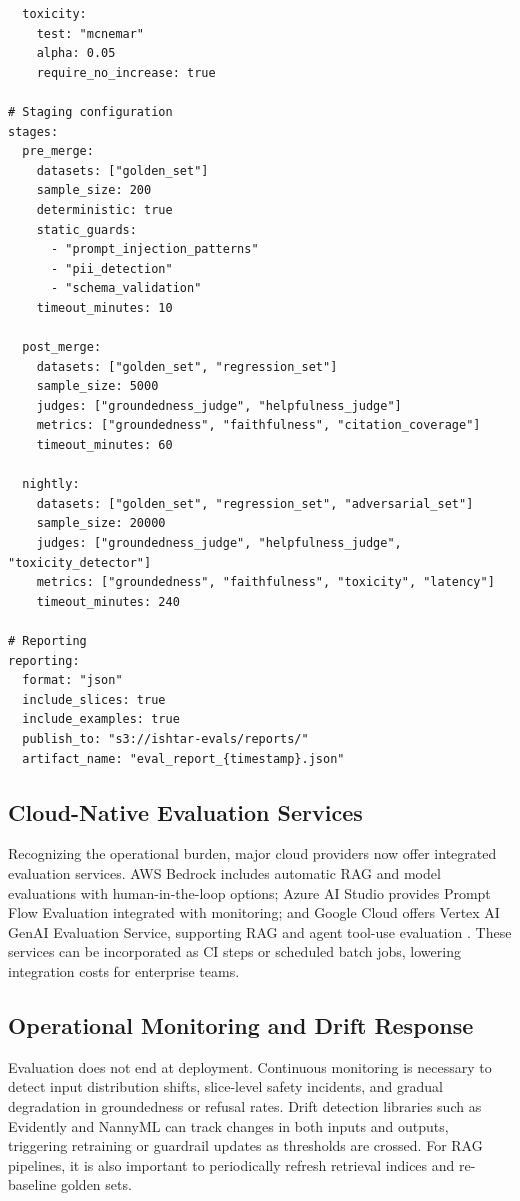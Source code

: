 \begin{codebox}
\begin{verbatim}
  toxicity:
    test: "mcnemar"
    alpha: 0.05
    require_no_increase: true

# Staging configuration
stages:
  pre_merge:
    datasets: ["golden_set"]
    sample_size: 200
    deterministic: true
    static_guards:
      - "prompt_injection_patterns"
      - "pii_detection"
      - "schema_validation"
    timeout_minutes: 10
  
  post_merge:
    datasets: ["golden_set", "regression_set"]
    sample_size: 5000
    judges: ["groundedness_judge", "helpfulness_judge"]
    metrics: ["groundedness", "faithfulness", "citation_coverage"]
    timeout_minutes: 60
  
  nightly:
    datasets: ["golden_set", "regression_set", "adversarial_set"]
    sample_size: 20000
    judges: ["groundedness_judge", "helpfulness_judge", "toxicity_detector"]
    metrics: ["groundedness", "faithfulness", "toxicity", "latency"]
    timeout_minutes: 240

# Reporting
reporting:
  format: "json"
  include_slices: true
  include_examples: true
  publish_to: "s3://ishtar-evals/reports/"
  artifact_name: "eval_report_{timestamp}.json"
\end{verbatim}
\end{codebox}

\subsection{Cloud-Native Evaluation Services}
Recognizing the operational burden, major cloud providers now offer integrated evaluation services. AWS Bedrock includes automatic RAG and model evaluations with human-in-the-loop options; Azure AI Studio provides Prompt Flow Evaluation integrated with monitoring; and Google Cloud offers Vertex AI GenAI Evaluation Service, supporting RAG and agent tool-use evaluation \cite{aws_bedrock_eval,azure_promptflow_eval,vertex_eval}. These services can be incorporated as CI steps or scheduled batch jobs, lowering integration costs for enterprise teams.

\subsection{Operational Monitoring and Drift Response}
Evaluation does not end at deployment. Continuous monitoring is necessary to detect input distribution shifts, slice-level safety incidents, and gradual degradation in groundedness or refusal rates. Drift detection libraries such as Evidently and NannyML can track changes in both inputs and outputs, triggering retraining or guardrail updates as thresholds are crossed. For RAG pipelines, it is also important to periodically refresh retrieval indices and re-baseline golden sets.

